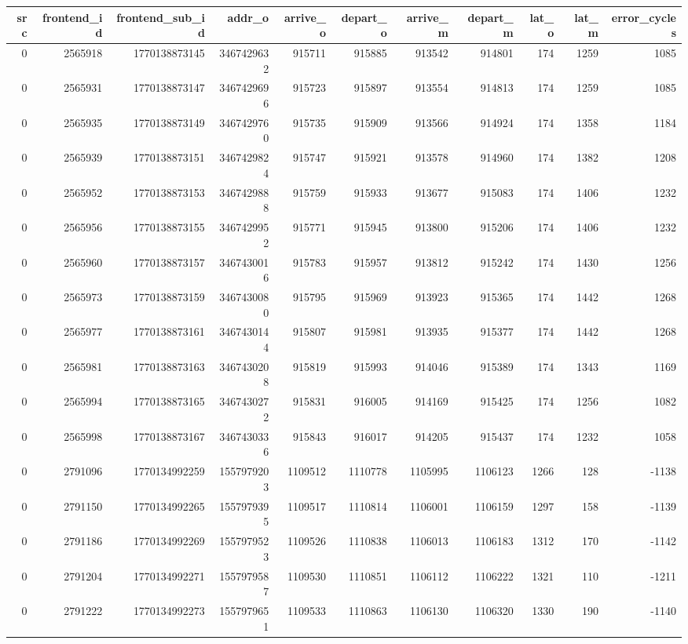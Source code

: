 \begin{tabular}{rrrrrrrrrrr}
\toprule
src & frontend\_id & frontend\_sub\_id & addr\_o & arrive\_o & depart\_o & arrive\_m & depart\_m & lat\_o & lat\_m & error\_cycles \\
\midrule
0 & 2565918 & 1770138873145 & 3467429632 & 915711 & 915885 & 913542 & 914801 & 174 & 1259 & 1085 \\
0 & 2565931 & 1770138873147 & 3467429696 & 915723 & 915897 & 913554 & 914813 & 174 & 1259 & 1085 \\
0 & 2565935 & 1770138873149 & 3467429760 & 915735 & 915909 & 913566 & 914924 & 174 & 1358 & 1184 \\
0 & 2565939 & 1770138873151 & 3467429824 & 915747 & 915921 & 913578 & 914960 & 174 & 1382 & 1208 \\
0 & 2565952 & 1770138873153 & 3467429888 & 915759 & 915933 & 913677 & 915083 & 174 & 1406 & 1232 \\
0 & 2565956 & 1770138873155 & 3467429952 & 915771 & 915945 & 913800 & 915206 & 174 & 1406 & 1232 \\
0 & 2565960 & 1770138873157 & 3467430016 & 915783 & 915957 & 913812 & 915242 & 174 & 1430 & 1256 \\
0 & 2565973 & 1770138873159 & 3467430080 & 915795 & 915969 & 913923 & 915365 & 174 & 1442 & 1268 \\
0 & 2565977 & 1770138873161 & 3467430144 & 915807 & 915981 & 913935 & 915377 & 174 & 1442 & 1268 \\
0 & 2565981 & 1770138873163 & 3467430208 & 915819 & 915993 & 914046 & 915389 & 174 & 1343 & 1169 \\
0 & 2565994 & 1770138873165 & 3467430272 & 915831 & 916005 & 914169 & 915425 & 174 & 1256 & 1082 \\
0 & 2565998 & 1770138873167 & 3467430336 & 915843 & 916017 & 914205 & 915437 & 174 & 1232 & 1058 \\
0 & 2791096 & 1770134992259 & 1557979203 & 1109512 & 1110778 & 1105995 & 1106123 & 1266 & 128 & -1138 \\
0 & 2791150 & 1770134992265 & 1557979395 & 1109517 & 1110814 & 1106001 & 1106159 & 1297 & 158 & -1139 \\
0 & 2791186 & 1770134992269 & 1557979523 & 1109526 & 1110838 & 1106013 & 1106183 & 1312 & 170 & -1142 \\
0 & 2791204 & 1770134992271 & 1557979587 & 1109530 & 1110851 & 1106112 & 1106222 & 1321 & 110 & -1211 \\
0 & 2791222 & 1770134992273 & 1557979651 & 1109533 & 1110863 & 1106130 & 1106320 & 1330 & 190 & -1140 \\

\end{tabular}

